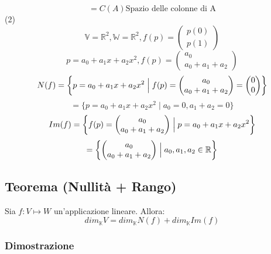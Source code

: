\documentclass[12pt]{article}
\begin{document}
\[= C(A) \text{Spazio delle colonne di A}\]
(2)
\[\mathbb{V}=\mathbb{R}^2, \mathbb{W}=\mathbb{R}^2, f(p) = \begin{pmatrix}
    p(0)\\
    p(1)
\end{pmatrix}\]
\[p = a_0 + a_1x + a_2x^2, f(p) = \begin{pmatrix}
    a_0\\
    a_0 + a_1 + a_2
\end{pmatrix}\]
\[N(f) = \left\{p = a_0 + a_1x + a_2x^2 \Bigm\vert f(p) = \begin{pmatrix}
    a_0\\
    a_0 + a_1 + a_2
\end{pmatrix} = \begin{pmatrix}
    0\\
    0
\end{pmatrix}\right\}\]
\[= \{p = a_0 + a_1x + a_2x^2 \mid a_0 = 0, a_1 + a_2 = 0\}\]
\[Im(f) = \left\{f(p) = \begin{pmatrix}
  a_0\\
    a_0 + a_1 + a_2
\end{pmatrix}  \Bigm\vert p = a_0 + a_1x + a_2x^2 \right\}\]
\[= \left\{ \begin{pmatrix}
    a_0\\
    a_0 + a_1 + a_2
\end{pmatrix} \Bigm\vert a_0, a_1, a_2 \in \mathbb{R} \right\}\]

\subsection{Teorema (Nullità + Rango)}
Sia $f: V \mapsto W$ un'applicazione lineare. Allora: \[dim_{\mathbb{K}}V = dim_{\mathbb{K}}N(f) + dim_{\mathbb{K}}Im(f)\]

\subsubsection{Dimostrazione}
\end{document}
